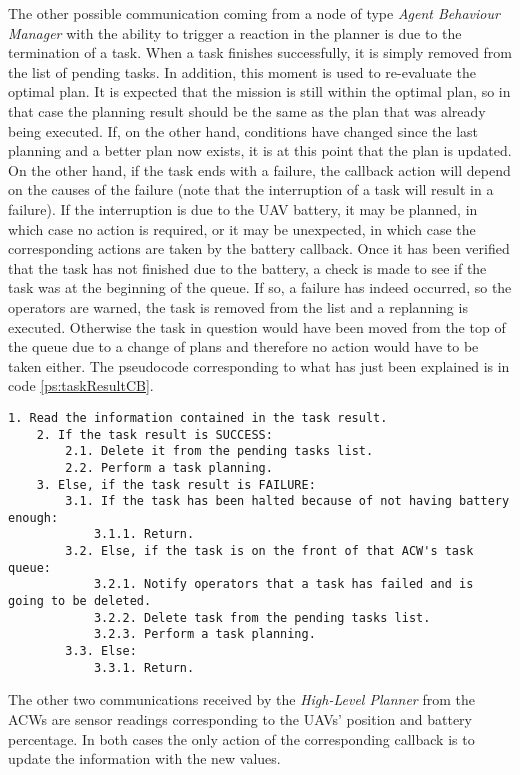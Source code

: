 The other possible communication coming from a node of type \emph{Agent Behaviour Manager} with the ability to trigger a reaction in the planner is due to the termination of a task. When a task finishes successfully, it is simply removed from the list of pending tasks. In addition, this moment is used to re-evaluate the optimal plan. It is expected that the mission is still within the optimal plan, so in that case the planning result should be the same as the plan that was already being executed. If, on the other hand, conditions have changed since the last planning and a better plan now exists, it is at this point that the plan is updated. On the other hand, if the task ends with a failure, the callback action will depend on the causes of the failure (note that the interruption of a task will result in a failure). If the interruption is due to the \gls{UAV} battery, it may be planned, in which case no action is required, or it may be unexpected, in which case the corresponding actions are taken by the battery callback. Once it has been verified that the task has not finished due to the battery, a check is made to see if the task was at the beginning of the queue. If so, a failure has indeed occurred, so the operators are warned, the task is removed from the list and a replanning is executed. Otherwise the task in question would have been moved from the top of the queue due to a change of plans and therefore no action would have to be taken either. The pseudocode corresponding to what has just been explained is in code \ref{ps:taskResultCB}.

\begin{lstlisting}[caption={Callback that runs when an \emph{Agent Behaviour Manager} sends a task result}, breaklines=true, label=ps:taskResultCB]
	1. Read the information contained in the task result.
	2. If the task result is SUCCESS:
		2.1. Delete it from the pending tasks list.
		2.2. Perform a task planning.
	3. Else, if the task result is FAILURE:
		3.1. If the task has been halted because of not having battery enough:
			3.1.1. Return.
		3.2. Else, if the task is on the front of that ACW's task queue:
			3.2.1. Notify operators that a task has failed and is going to be deleted.
			3.2.2. Delete task from the pending tasks list.
			3.2.3. Perform a task planning.
		3.3. Else:
			3.3.1. Return.
\end{lstlisting}

The other two communications received by the \emph{High-Level Planner} from the \glspl{ACW} are sensor readings corresponding to the \glspl{UAV}' position and battery percentage. In both cases the only action of the corresponding callback is to update the information with the new values.

